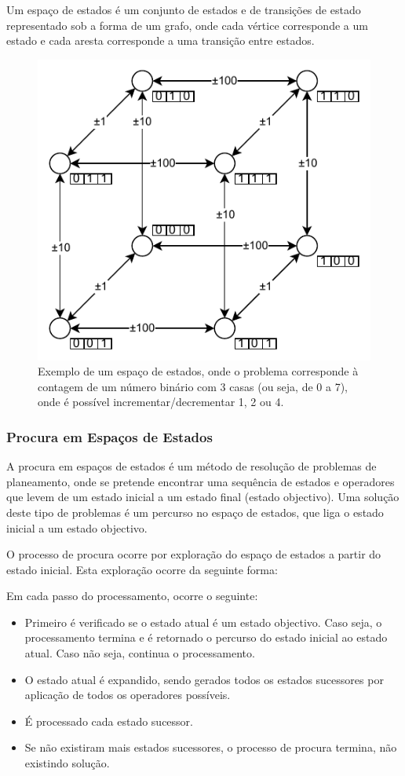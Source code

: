 \documentclass[a4paper,12pt]{article}
\begin{document}
Um espaço de estados é um conjunto de estados e de transições de estado representado sob a forma de um grafo, onde cada vértice corresponde a um estado e cada aresta corresponde a uma transição entre estados.
\begin{figure}[h]
\centering
\includegraphics{espaco_estados}
\caption{Exemplo de um espaço de estados, onde o problema corresponde à contagem de um número binário com 3 casas (ou seja, de 0 a 7), onde é possível incrementar/decrementar 1, 2 ou 4.}
\end{figure}

\subsubsection{Procura em Espaços de Estados} \label{procura_em_espacos_de_estados}
A procura em espaços de estados é um método de resolução de problemas de planeamento, onde se pretende encontrar uma sequência de estados e operadores que levem de um estado inicial a um estado final (estado objectivo).
Uma solução deste tipo de problemas é um percurso no espaço de estados, que liga o estado inicial a um estado objectivo.

O processo de procura ocorre por exploração do espaço de estados a partir do estado inicial. Esta exploração ocorre da seguinte forma:

Em cada passo do processamento, ocorre o seguinte:
\begin{itemize}
	\item Primeiro é verificado se o estado atual é um estado objectivo. Caso seja, o processamento termina e é retornado o percurso do estado inicial ao estado atual. Caso não seja, continua o processamento.
	\item O estado atual é expandido, sendo gerados todos os estados sucessores por aplicação de todos os operadores possíveis.
	\item É processado cada estado sucessor.
	\item Se não existiram mais estados sucessores, o processo de procura termina, não existindo solução.
\end{itemize}
\end{document}
